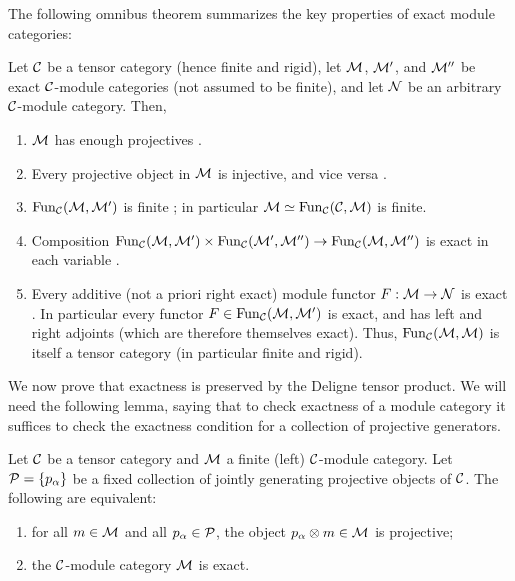 \documentclass{amsart}
\begin{document}
The following omnibus theorem summarizes the key properties of exact module categories: 
\begin{theorem} \label{Thm:ExactModCatOmnibus}
	Let $\mathcal C$ be a tensor category (hence finite and rigid), let $\mathcal M$, $\mathcal M'$, and $\mathcal M''$ be exact $\mathcal C$-module categories (not assumed to be finite), and let $\mathcal N$ be an arbitrary $\mathcal C$-module category. Then,
	\begin{enumerate}
		\item $\mathcal M$ has enough projectives \cite[Lemma 3.4]{EO-ftc} \cite[Lemma 2.7.1]{EGNO}.
		\item Every projective object in $\mathcal M$  is injective, and vice versa \cite[Cor. 3.6]{EO-ftc} \cite[Cor 2.7.4]{EGNO}.
		\item $\operatorname{Fun}_{\mathcal C}(\mathcal M, \mathcal M')$ is finite \cite[Prop 2.13.5]{EGNO}; in particular $\mathcal M \simeq \operatorname{Fun}_{\mathcal C}(\mathcal C, \mathcal M)$ is finite.
		\item Composition $\operatorname{Fun}_{\mathcal C}(\mathcal M, \mathcal M') \times \operatorname{Fun}_{\mathcal C}(\mathcal M', \mathcal M'') \to \operatorname{Fun}_{\mathcal C}(\mathcal M, \mathcal M'')$ is exact in each variable \cite[Lemma 3.20]{EO-ftc} \cite[Lemma 2.13.2]{EGNO}	.	
		\item Every additive (not a priori right exact) module functor $F:\mathcal M \to \mathcal N$ is exact \cite[Prop. 3.11]{EO-ftc} \cite[Prop 2.7.8]{EGNO}. In particular every functor $F \in \operatorname{Fun}_{\mathcal C}(\mathcal M, \mathcal M')$ is exact, and has left and right adjoints (which are therefore themselves exact). Thus, $\operatorname{Fun}_{\mathcal C}(\mathcal M,\mathcal M)$ is itself a tensor category (in particular finite and rigid). 
	\end{enumerate} %
\end{theorem}

\noindent We now prove that exactness is preserved by the Deligne tensor product.  We will need the following lemma, saying that to check exactness of a module category it suffices to check the exactness condition for a collection of projective generators. 

\begin{lemma} \label{lma:Exact_checked_on_proj_gens}
	Let $\mathcal C$ be a tensor category and $\mathcal M$ a finite (left) $\mathcal C$-module category. Let $\mathcal P = \{ p_\alpha \}$ be a fixed collection of jointly generating projective objects of  $\mathcal C$. The following are equivalent:
	\begin{enumerate}
		\item for all $m \in \mathcal M$ and all $p_\alpha \in \mathcal P$, the object $p_\alpha \otimes m \in \mathcal M$ is projective;
		\item the $\mathcal C$-module category $\mathcal M$ is exact.
	\end{enumerate}
\end{lemma}
\end{document}
